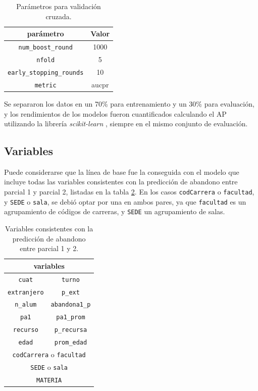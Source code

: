 \documentclass[a4paper,11pt,dvipsnames]{article}
\begin{document}
\begin{table}[!ht]
    \caption{Parámetros para validación cruzada.}
    \begin{center}
    \begin{tabular}{cc}
    \hline
    \textbf{parámetro} & \textbf{Valor}\\
    \hline
    \texttt{num\_boost\_round}  & 1000\\
    \texttt{nfold} & 5\\
    \texttt{early\_stopping\_rounds} & 10\\
    \texttt{metric} & aucpr\\
    \hline
    \end{tabular}
    \label{tab:cv}
    \end{center}
\end{table}

Se separaron los datos en un 70\% para entrenamiento y un 30\% para evaluación, y los rendimientos de los modelos fueron cuantificados calculando el AP utilizando la librería \textit{scikit-learn} \cite{scikit-learn}, siempre en el mismo conjunto de evaluación.

\subsection{Variables}

Puede considerarse que la línea de base fue la conseguida con el modelo que incluye todas las variables consistentes con la predicción de abandono entre parcial 1 y parcial 2, listadas en la tabla \ref{tab:variables}. En los casos \texttt{codCarrera} o \texttt{facultad}, y \texttt{SEDE} o \texttt{sala}, se debió optar por una en ambos pares, ya que \texttt{facultad} es un agrupamiento de códigos de carreras, y \texttt{SEDE} un agrupamiento de salas.\par\medskip

\begin{table}[!ht]
    \caption{Variables consistentes con la predicción de abandono entre parcial 1 y 2.}
    \begin{center}
    \begin{tabular}{cc}
    \hline
    \multicolumn{2}{c}{\textbf{variables}}\\
    \hline
    \texttt{cuat}  & \texttt{turno}\\
    \texttt{extranjero} & \texttt{p\_ext}\\
    \texttt{n\_alum} & \texttt{abandona1\_p}\\
    \texttt{pa1} & \texttt{pa1\_prom}\\
    \texttt{recurso} & \texttt{p\_recursa}\\
    \texttt{edad} & \texttt{prom\_edad}\\
    \multicolumn{2}{c}{\texttt{codCarrera} o \texttt{facultad}}\\
    \multicolumn{2}{c}{\texttt{SEDE} o \texttt{sala}}\\
    \multicolumn{2}{c}{\texttt{MATERIA}}\\
    \hline
    \end{tabular}
    \label{tab:variables}
    \end{center}
\end{table}
\end{document}
